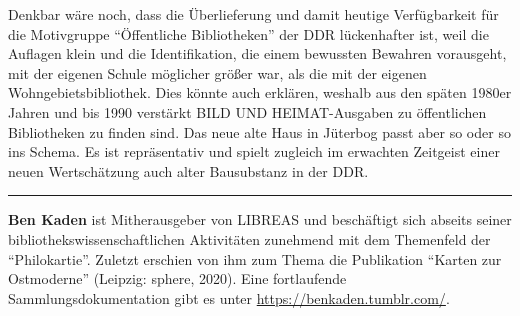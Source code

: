 \documentclass[a4paper,
fontsize=11pt,
oneside,
numbers=noperiodatend,
parskip=half-,
bibliography=totoc,
final
]{scrartcl}
\begin{document}
Denkbar wäre noch, dass die Überlieferung und damit heutige
Verfügbarkeit für die Motivgruppe \enquote{Öffentliche Bibliotheken} der
DDR lückenhafter ist, weil die Auflagen klein und die Identifikation,
die einem bewussten Bewahren vorausgeht, mit der eigenen Schule
möglicher größer war, als die mit der eigenen Wohngebietsbibliothek.
Dies könnte auch erklären, weshalb aus den späten 1980er Jahren und bis
1990 verstärkt BILD UND HEIMAT-Ausgaben zu öffentlichen Bibliotheken zu
finden sind. Das neue alte Haus in Jüterbog passt aber so oder so ins
Schema. Es ist repräsentativ und spielt zugleich im erwachten Zeitgeist
einer neuen Wertschätzung auch alter Bausubstanz in der DDR.


\begin{center}\rule{0.5\linewidth}{0.5pt}\end{center}

\textbf{Ben Kaden} ist Mitherausgeber von LIBREAS und beschäftigt sich
abseits seiner bibliothekswissenschaftlichen Aktivitäten zunehmend mit
dem Themenfeld der \enquote{Philokartie}. Zuletzt erschien von ihm zum Thema
die Publikation \enquote{Karten zur Ostmoderne} (Leipzig: sphere, 2020). Eine
fortlaufende Sammlungsdokumentation gibt es unter
\url{https://benkaden.tumblr.com/}.
\end{document}
